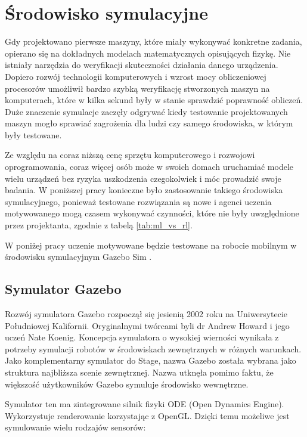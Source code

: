\chapter{Środowisko symulacyjne}
\label{cha:rozdzial4}

Gdy projektowano pierwsze maszyny, które miały wykonywać konkretne zadania, opierano
się na dokładnych modelach matematycznych opisujących fizykę. Nie istniały narzędzia
do weryfikacji skuteczności działania danego urządzenia. Dopiero rozwój technologii
komputerowych i wzrost mocy obliczeniowej procesorów umożliwił bardzo szybką 
weryfikację stworzonych maszyn na komputerach, które w kilka sekund były w stanie 
sprawdzić poprawność obliczeń. Duże znaczenie symulacje zaczęły odgrywać kiedy
testowanie projektowanych maszyn mogło sprawiać zagrożenia dla ludzi czy samego
środowiska, w którym były testowane.

Ze względu na coraz niższą cenę sprzętu komputerowego i rozwojowi oprogramowania,
coraz więcej osób może w swoich domach uruchamiać modele wielu urządzeń bez ryzyka
uszkodzenia czegokolwiek i móc prowadzić swoje badania. W poniższej pracy konieczne
było zastosowanie takiego środowiska symulacyjnego, ponieważ testowane rozwiązania
są nowe i agenci uczenia motywowanego mogą czasem wykonywać czynności, które nie
były uwzględnione przez projektanta, zgodnie z tabelą \ref{tab:ml_vs_rl}.

W poniżej pracy uczenie motywowane będzie testowane na robocie mobilnym w środowisku
symulacyjnym Gazebo Sim \cite{gazebo_sim_website}.

\section{Symulator Gazebo}

Rozwój symulatora Gazebo rozpoczął się jesienią 2002 roku na Uniwersytecie 
Południowej Kalifornii. Oryginalnymi twórcami byli dr Andrew Howard i jego 
uczeń Nate Koenig. Koncepcja symulatora o wysokiej wierności wynikała z potrzeby 
symulacji robotów w środowiskach zewnętrznych w różnych warunkach. 
Jako komplementarny symulator do Stage, nazwa Gazebo została wybrana jako 
struktura najbliższa scenie zewnętrznej. Nazwa utknęła pomimo faktu, że 
większość użytkowników Gazebo symuluje środowisko wewnętrzne.

Symulator ten ma zintegrowane silnik fizyki ODE (Open Dynamics Engine). Wykorzystuje
renderowanie korzystając z OpenGL. Dzięki temu możeliwe jest symulowanie wielu 
rodzajów sensorów:

